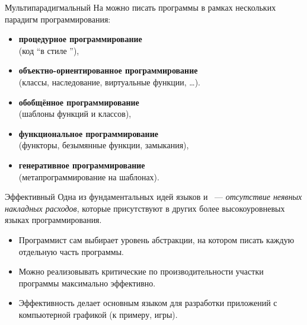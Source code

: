 \documentclass[aspectration=1610]{beamer}
\begin{document}
\begin{frame}{Мультипарадигмальный}
На \langcpp можно писать программы в рамках нескольких парадигм программирования:
    \begin{itemize}
        \item {\bf процедурное программирование}\\
            (код ``в стиле \langc''),
            
        \item {\bf объектно-ориентированное программирование}\\
            (классы, наследование, виртуальные функции, \dots).
            
        \item {\bf обобщённое программирование}\\
            (шаблоны функций и классов),

        \item {\bf функциональное программирование}\\
            (функторы, безымянные функции, замыкания),
            
        \item {\bf генеративное программирование}\\
            (метапрограммирование на шаблонах).
    \end{itemize}
\end{frame}

\begin{frame}{Эффективный}
Одна из фундаментальных идей языков \langc и \langcpp~--- {\em
отсутствие неявных накладных расходов}, которые присутствуют
в других более высокоуровневых языках программирования.


\begin{itemize}
\item   Программист сам выбирает уровень абстракции, на котором писать
каждую отдельную часть программы. 

\item   Можно реализовывать критические по производительности участки
программы максимально эффективно.

\item Эффективность делает \langcpp основным языком для разработки приложений
с компьютерной графикой (к примеру, игры).
\end{itemize}

\end{frame}
\end{document}
